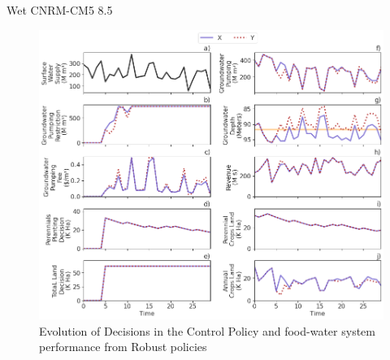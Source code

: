 \documentclass[11pt,a4paper]{article}
\begin{document}
Wet CNRM-CM5 8.5
\begin{figure}[H]
    \centering
    \includegraphics[width=1\textwidth]{selected_robust_performance_s2_wet.png}
    \caption{Evolution of Decisions in the Control Policy and food-water system performance from Robust policies}
    \label{fig:m1esh1}
\end{figure}





\newpage
\printbibliography
\end{document}
